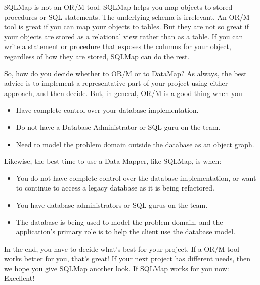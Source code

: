 SQLMap is not an OR/M tool. SQLMap helps you map objects to stored procedures
or SQL statements. The underlying schema is irrelevant. An OR/M tool is great
if you can map your objects to tables. But they are not so great if your
objects are stored as a relational view rather than as a table. If you can
write a statement or procedure that exposes the columns for your object,
regardless of how they are stored, SQLMap can do the rest.

So, how do you decide whether to OR/M or to DataMap? As always, the best
advice is to implement a representative part of your project using either
approach, and then decide. But, in general, OR/M is a good thing when you
\begin{itemize}
  \item Have complete control over your database implementation.
  \item Do not have a Database Administrator or SQL guru on the team.
  \item Need to model the problem domain outside the database as an object graph.
\end{itemize}
Likewise, the best time to use a Data Mapper, like SQLMap, is when:
\begin{itemize}
  \item You do not have complete control over the database implementation, or want to
continue to access a legacy database as it is being refactored.
  \item You have database administrators or SQL gurus on the team.
  \item The database is being used to model the problem domain, and the application's
primary role is to help the client use the database model.
\end{itemize}

In the end, you have to decide what's best for your project. If a OR/M tool
works better for you, that's great! If your next project has different needs,
then we hope you give SQLMap another look. If SQLMap works for you now:
Excellent!
